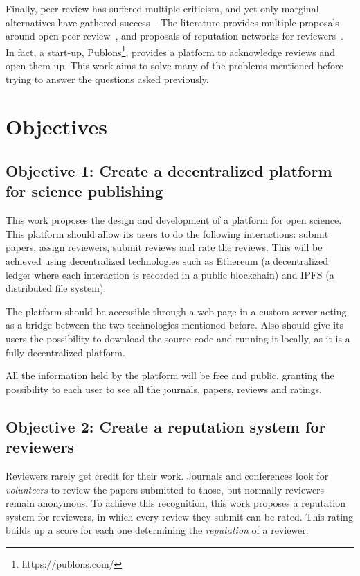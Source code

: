 Finally, peer review has suffered multiple criticism, and yet only marginal alternatives
have gathered success~\cite{ware2008peer}. The literature provides multiple
proposals around open peer review~\cite{ford2013defining}, and proposals of
reputation networks for reviewers~\cite{frishauf2009reputation}. In fact, a
start-up, Publons\footnote{https://publons.com/}, provides a platform to
acknowledge reviews and open them up. This work aims to solve many of
the problems mentioned before trying to answer the questions asked previously.

\section{Objectives}
\label{sec:objectives}
\subsection*{Objective 1: Create a decentralized platform for science publishing}

This work proposes the design and development of a platform for open science.
This platform should allow its users to do the following interactions: submit
papers, assign reviewers, submit reviews and rate the reviews. This will be
achieved using decentralized technologies such as Ethereum (a decentralized
ledger where each interaction is recorded in a public blockchain) and IPFS (a
distributed file system).

The platform should be accessible through a web page in a custom server acting
as a bridge between the two technologies mentioned before. Also should give its
users the possibility to download the source code and running it locally, as it
is a fully decentralized platform.

All the information held by the platform will be free and public, granting the
possibility to each user to see all the journals, papers, reviews and ratings.

\subsection*{Objective 2: Create a reputation system for reviewers}

Reviewers rarely get credit for their work. Journals and conferences look for
\emph{volunteers} to review the papers submitted to those, but normally
reviewers remain anonymous. To achieve this recognition, this work proposes a
reputation system for reviewers, in which every review they submit can be rated.
This rating builds up a score for each one determining the
\emph{reputation} of a reviewer.

